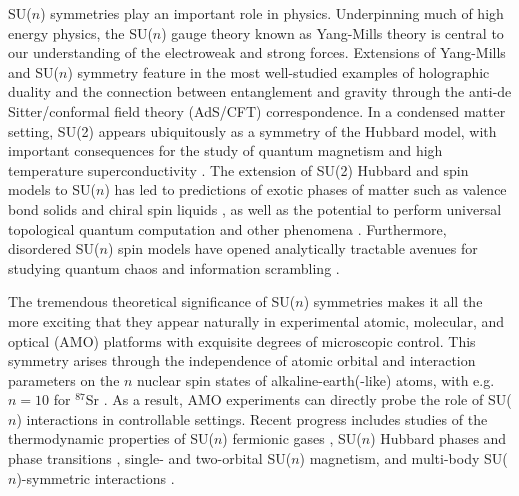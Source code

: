 \documentclass[aps,pra,nofootinbib,twocolumn,superscriptaddress]{revtex4-2}
\newcommand{\1}{\mathds{1}}
\begin{document}
SU($n$) symmetries play an important role in physics.
Underpinning much of high energy physics, the SU($n$) gauge theory known as Yang-Mills theory is central to our understanding of the electroweak and strong forces.
Extensions of Yang-Mills and SU($n$) symmetry feature in the most well-studied examples of holographic duality \cite{maldacena1999largen} and the connection between entanglement and gravity \cite{ryu2006holographic} through the anti-de Sitter/conformal field theory (AdS/CFT) correspondence.
In a condensed matter setting, SU(2) appears ubiquitously as a symmetry of the Hubbard model, with important consequences for the study of quantum magnetism and high temperature superconductivity \cite{lee2006doping}.
The extension of SU(2) Hubbard and spin models to SU($n$) has led to predictions of exotic phases of matter such as valence bond solids \cite{read1989valencebond, rokhsar1990quadratic, kaul2012lattice, hermele2011topological} and chiral spin liquids \cite{hermele2009mott, hermele2011topological, chen2016syntheticgaugefield, nataf2016chiral}, as well as the potential to perform universal topological quantum computation \cite{freedman2004class, nayak2008nonabelian} and other phenomena \cite{nataf2014exact, nataf2016exact}.
Furthermore, disordered SU($n$) spin models have opened analytically tractable avenues for studying quantum chaos and information scrambling \cite{sachdev1993gapless}.

The tremendous theoretical significance of SU($n$) symmetries makes it all the more exciting that they appear naturally in experimental atomic, molecular, and optical (AMO) platforms with exquisite degrees of microscopic control.
This symmetry arises through the independence of atomic orbital and interaction parameters on the $n$ nuclear spin states of alkaline-earth(-like) atoms, with e.g.~$n=10$ for ${}^{87}$Sr \cite{wu2003exact, cazalilla2009ultracold, gorshkov2010twoorbital, cazalilla2014ultracold}.
As a result, AMO experiments can directly probe the role of SU($n$) interactions in controllable settings.
Recent progress includes studies of the thermodynamic properties of SU($n$) fermionic gases \cite{hazzard2012hightemperature, bonnes2012adiabatic, stellmer2013degenerate, yip2014theory, pagano2014onedimensional, choudhury2020collective, song2020evidence, sonderhouse2020thermodynamics}, SU($n$) Hubbard phases and phase transitions \cite{taie2012su, hofrichter2016direct, taie2020observation}, single- \cite{messio2012entropy} and two-orbital \cite{cappellini2014direct, scazza2014observation, zhang2014spectroscopic, beverland2016realizing} SU($n$) magnetism, and multi-body SU($n$)-symmetric interactions \cite{goban2018emergence, perlin2019effective}.
\end{document}
